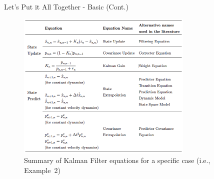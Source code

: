 \begin{frame}{Let's Put it All Together - Basic (Cont.)}
    \begin{figure}
	   \centering
	   \includegraphics[width=0.75\textwidth]{Figures/Chapter1/KalmanFilterSummery.png}
	       \caption{Summary of Kalman Filter equations for a specific case (i.e., Example~2) }
    \label{tab:my_label}
	   \vspace{-10pt}
	   \end{figure}





\end{frame}

